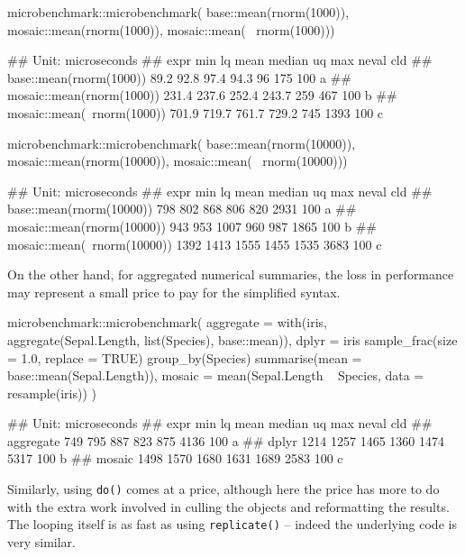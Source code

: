 \begin{Schunk}
\begin{Sinput}
microbenchmark::microbenchmark( 
  base::mean(rnorm(1000)), 
  mosaic::mean(rnorm(1000)), 
  mosaic::mean(~ rnorm(1000)))
\end{Sinput}
\begin{Soutput}
## Unit: microseconds
##                        expr   min    lq  mean median  uq  max neval cld
##     base::mean(rnorm(1000))  89.2  92.8  97.4   94.3  96  175   100 a  
##   mosaic::mean(rnorm(1000)) 231.4 237.6 252.4  243.7 259  467   100  b 
##  mosaic::mean(~rnorm(1000)) 701.9 719.7 761.7  729.2 745 1393   100   c
\end{Soutput}
\begin{Sinput}
microbenchmark::microbenchmark( 
  base::mean(rnorm(10000)), 
  mosaic::mean(rnorm(10000)), 
  mosaic::mean(~ rnorm(10000)))
\end{Sinput}
\begin{Soutput}
## Unit: microseconds
##                         expr  min   lq mean median   uq  max neval cld
##     base::mean(rnorm(10000))  798  802  868    806  820 2931   100 a  
##   mosaic::mean(rnorm(10000))  943  953 1007    960  987 1865   100  b 
##  mosaic::mean(~rnorm(10000)) 1392 1413 1555   1455 1535 3683   100   c
\end{Soutput}
\end{Schunk}

On the other hand, for aggregated numerical summaries, the loss in
performance may represent a small price to pay for the simplified
syntax.

\begin{Schunk}
\begin{Sinput}
microbenchmark::microbenchmark( 
  aggregate = with(iris, aggregate(Sepal.Length, list(Species), base::mean)),
  dplyr = iris %
    sample_frac(size = 1.0, replace = TRUE) %
    group_by(Species) %
    summarise(mean = base::mean(Sepal.Length)),
  mosaic = mean(Sepal.Length ~ Species, data = resample(iris))
)
\end{Sinput}
\begin{Soutput}
## Unit: microseconds
##       expr  min   lq mean median   uq  max neval cld
##  aggregate  749  795  887    823  875 4136   100 a  
##      dplyr 1214 1257 1465   1360 1474 5317   100  b 
##     mosaic 1498 1570 1680   1631 1689 2583   100   c
\end{Soutput}
\end{Schunk}

Similarly, using \texttt{do()} comes at a price, although here the price
has more to do with the extra work involved in culling the objects and
reformatting the results. The looping itself is as fast as using
\texttt{replicate()} -- indeed the underlying code is very similar.

